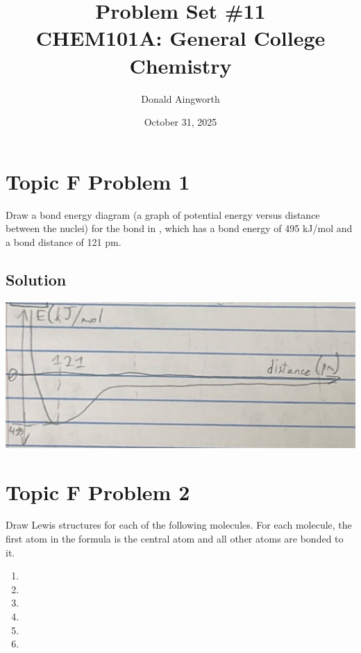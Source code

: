 \documentclass[10pt]{article}
\title{
    Problem Set \#11
    \\  \small
    CHEM101A: General College Chemistry
    }
\author{Donald Aingworth}
\date{October 31, 2025}
\begin{document}

    \maketitle


    \pagebreak
    \section{Topic F Problem 1}
        Draw a bond energy diagram (a graph of potential energy versus distance between the nuclei) for the bond in , which has a bond energy of 495 kJ/mol and a bond distance of 121 pm.
        
        \subsection{Solution}
            \begin{center}
                \includegraphics[width=\textwidth]{Answers Images/F1.jpg}
            \end{center}

    \pagebreak
    \section{Topic F Problem 2}
        Draw Lewis structures for each of the following molecules. 
        For each molecule, the first atom in the formula is the central atom and all other atoms are bonded to it.
        \begin{multicols}{3}
            \begin{enumerate}[label=\alph*)]
                \item   {}
                \item   {}
                \item   {}
                \item   {}
                \item   {}
                \item   {}
            \end{enumerate}
        \end{multicols}
        
\end{document}
